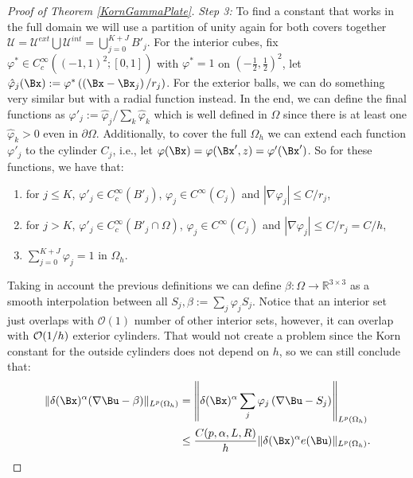 \begin{proof}[Proof of Theorem \ref{KornGammaPlate}]
\textit{Step 3:} To find a constant that works in the full domain we will use a  partition of unity again for both covers together $\mathcal{U}=\mathcal{U}^{ext}\bigcup\mathcal{U}^{int}= \bigcup_{j=0}^{K+J} B'_j$. For the interior cubes, fix $\varphi^* \in C_c^{\infty}\left((-1,1)^2 ;[0,1]\right)$ with $\varphi^*=1$ on $\left(-\frac{1}{2}, \frac{1}{2}\right)^2$, let $\hat{\varphi}_j(\Bx):=\varphi^*\left(\left(\Bx-\Bx_j\right) / r_j\right)$. For the exterior balls, we can do something very similar but with a radial function instead. In the end, we can define the final functions as $\varphi'_j:=\hat{\varphi}_j / \sum_k \hat{\varphi}_k$ which is well defined in $\Omega$ since there is at least one $\hat{\varphi}_k>0$ even in $\partial\Omega$. Additionally,  to cover the full $\Omega_h$ we  can extend each function $\varphi'_j$ to the cylinder $C_j$, i.e., let $\varphi(\Bx)=\varphi(\Bx',z)=\varphi'(\Bx')$. So for these functions, we have that:
\begin{enumerate}
    \item for $j\leq K$, $\varphi'_j \in C_c^{\infty}\left(B'_j\right)$, $\varphi_j \in C^{\infty}\left(C_j\right)$ and $\left|\nabla \varphi_j\right| \leq C / r_j$,
    \item for $j>K$, $\varphi'_j \in C_c^{\infty}\left(B'_j\cap \Omega\right)$,  $\varphi_j \in C^{\infty}\left(C_j\right)$ and $\left|\nabla \varphi_j\right| \leq C / r_j = C/h$,  
    \item $ \sum_{j=0}^{K+J} \varphi_j=1$ in $\Omega_h$.
\end{enumerate}
Taking in account the previous definitions we can define $\beta: \Omega \rightarrow \mathbb{R}^{3 \times 3}$ as a smooth interpolation between all $S_j, \beta:=\sum_j \varphi_j S_j$. Notice that an interior set just overlaps with $\mathcal{O}(1)$ number of other interior sets, however, it can overlap with ${\mathcal O}(1/h)$ exterior cylinders. That would not create a problem since the Korn constant for the outside cylinders does not depend on $h$, so we can still conclude that: 
\begin{align*}
\|\delta(\Bx)^\alpha(\nabla \Bu-\beta)\|_{L^p(\Omega_h)}&=\left\|\delta(\Bx)^\alpha\sum_j \varphi_j\left(\nabla \Bu-S_j\right)\right\|_{L^p(\Omega_h)} \\ 
& \leq  \frac{C(p,\alpha,L,R)}{h} \|\delta(\Bx)^\alpha e(\Bu)\|_{L^p(\Omega_h)}.
\end{align*}


\end{proof}
